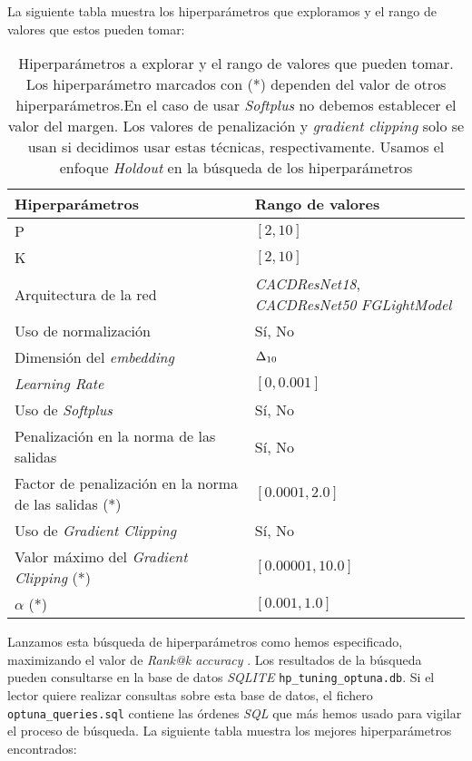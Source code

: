 La siguiente tabla muestra los hiperparámetros que exploramos y el rango de valores que estos pueden tomar:

\begin{table}[H]
\centering
    \begin{tabular}{|l|p{5cm}|}
    \hline
    \textbf{Hiperparámetros} & \textbf{Rango de valores} \\
    \hline

    P & $[2, 10]$ \\
    K & $[2, 10]$ \\
    Arquitectura de la red & \textit{CACDResNet18}, \textit{CACDResNet50} \textit{FGLightModel} \\
    Uso de normalización & Sí, No \\
    Dimensión del \textit{embedding} & $\Delta_{10}$ \\
    \textit{Learning Rate} & $[0, 0.001]$ \\
    Uso de \textit{Softplus} & Sí, No \\
    Penalización en la norma de las salidas & Sí, No \\
    Factor de penalización en la norma de las salidas (*) & $[0.0001, 2.0]$ \\
    Uso de \textit{Gradient Clipping} & Sí, No \\
    Valor máximo del \textit{Gradient Clipping} (*) & $[0.00001, 10.0]$ \\
    $\alpha$ (*) & $[0.001, 1.0]$ \\

    \hline

\end{tabular}
\caption{Hiperparámetros a explorar y el rango de valores que pueden tomar. Los hiperparámetro marcados con (*) dependen del valor de otros hiperparámetros.En el caso de usar \textit{Softplus} no debemos establecer el valor del margen. Los valores de penalización y \textit{gradient clipping} solo se usan si decidimos usar estas técnicas, respectivamente. Usamos el enfoque \textit{Holdout} en la búsqueda de los hiperparámetros}
\end{table}

Lanzamos esta búsqueda de hiperparámetros como hemos especificado, maximizando el valor de \textit{Rank@k accuracy} \footnotemark. Los resultados de la búsqueda pueden consultarse en la base de datos \textit{SQLITE} \lstinline{hp_tuning_optuna.db}. Si el lector quiere realizar consultas sobre esta base de datos, el fichero \lstinline{optuna_queries.sql} contiene las órdenes \textit{SQL} que más hemos usado para vigilar el proceso de búsqueda. La siguiente tabla muestra los mejores hiperparámetros encontrados:


